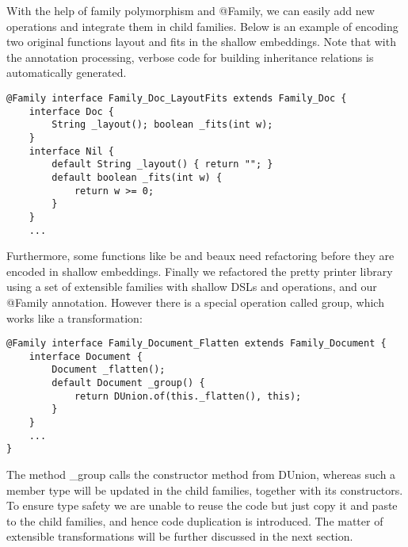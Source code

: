 With the help of family polymorphism and \textsf{@Family}, we can easily add new operations and integrate them
in child families. Below is an example of encoding two original functions \textsf{layout} and \textsf{fits} in
the shallow embeddings. Note that with the annotation processing, verbose code for building inheritance relations is
automatically generated.
\begin{lstlisting}
@Family interface Family_Doc_LayoutFits extends Family_Doc {
	interface Doc {
		String _layout(); boolean _fits(int w);
	}
	interface Nil {
		default String _layout() { return ""; }
		default boolean _fits(int w) {
			return w >= 0;
		}
	}
	...
\end{lstlisting}
Furthermore, some functions like \textsf{be} and \textsf{beaux} need refactoring before they are encoded in shallow embeddings.
Finally we refactored the pretty printer library using a set of extensible families with shallow DSLs and operations, and our
\textsf{@Family} annotation. However there is a special operation called \textsf{group}, which works like a transformation:
\begin{lstlisting}
@Family interface Family_Document_Flatten extends Family_Document {
	interface Document {
		Document _flatten();
		default Document _group() {
			return DUnion.of(this._flatten(), this);
		}
	}
	...
}
\end{lstlisting}
The method \textsf{\_group} calls the constructor method from \textsf{DUnion}, whereas such a member type will be updated in the
child families, together with its constructors. To ensure type safety we are unable to reuse the code but just copy it and paste
to the child families, and hence code duplication is introduced. The matter of extensible transformations will be further discussed
in the next section.
